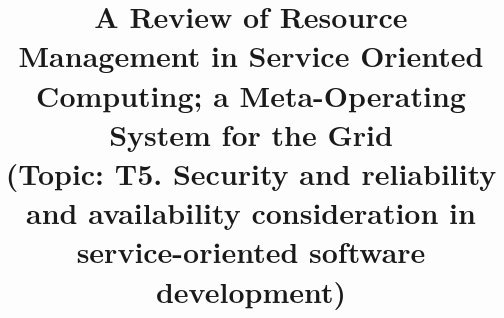 \documentclass[conference]{IEEEtran}
\begin{document}
%
\title{A Review of Resource Management in Service Oriented Computing; a Meta-Operating System for the Grid \\
\small{(Topic: T5.	Security and reliability and availability consideration in service-oriented software development)}}


\author{
}


% 
\end{document}
